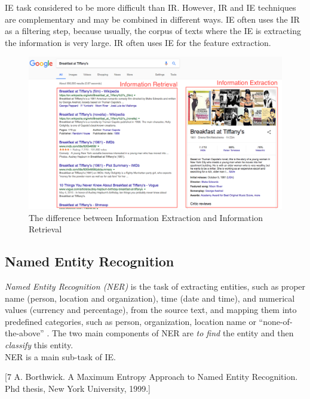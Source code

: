 IE task considered to be more difficult than IR. However, IR and IE techniques are complementary and may be combined in different ways. IE often uses the IR as a filtering step, because usually, the corpus of texts where the IE is extracting the information is very large. IR often uses IE for the feature extraction.\\

\begin{figure}[h]
\begin{center}
\includegraphics[width=1.0\textwidth]{figures03/retrieval_extraction}
\caption{The difference between Information Extraction and Information Retrieval}
\label{fig:architecture}
\end{center}
\end{figure}


\subsection{Named Entity Recognition}
\textit{Named Entity Recognition (NER)} is the task of extracting entities, such as proper name (person, location and organization), time (date and time), and numerical values (currency and percentage), from the source text, and mapping them into predefined categories, such as person, organization, location name or “none-of-the-above” \cite{MaxEntropy}. The two main components of NER are \textit{to find} the entity and then \textit{classify} this entity. \\

NER is a main sub-task of IE.  

[7 A. Borthwick. A Maximum Entropy Approach to Named Entity Recognition. Phd thesis, New York University, 1999.] \\

